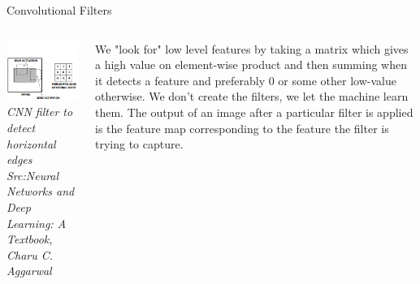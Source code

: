 \begin{frame}{Convolutional Filters}
	\begin{columns}[T]
        \begin{column}{0.5\textwidth}
        	\includegraphics[width=\textwidth]{images/CNN_filter.png}
			\tiny{\textit{CNN filter to detect horizontal edges\\Src:Neural Networks and Deep Learning: A Textbook, Charu C. Aggarwal }}
        \end{column}
	    \begin{column}{0.5\textwidth} 
			We "look for" low level features by taking a matrix which gives a high value on element-wise product and then summing when it detects a feature and preferably 0 or some  other low-value otherwise. We don't create the filters, we let the machine learn them. The output of an image after a particular filter is applied is the feature map corresponding to the feature the filter is trying to capture.
    	\end{column}
    \end{columns}
\end{frame}

